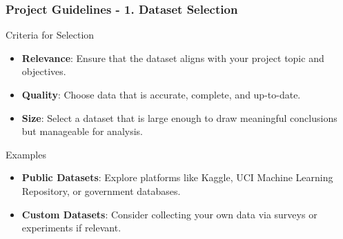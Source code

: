 \documentclass{beamer}
\begin{document}
\begin{frame}[fragile]
    \frametitle{Project Guidelines - 1. Dataset Selection}
    \begin{block}{Criteria for Selection}
        \begin{itemize}
            \item \textbf{Relevance}: Ensure that the dataset aligns with your project topic and objectives.
            \item \textbf{Quality}: Choose data that is accurate, complete, and up-to-date.
            \item \textbf{Size}: Select a dataset that is large enough to draw meaningful conclusions but manageable for analysis.
        \end{itemize}
    \end{block}

    \begin{block}{Examples}
        \begin{itemize}
            \item \textbf{Public Datasets}: Explore platforms like Kaggle, UCI Machine Learning Repository, or government databases.
            \item \textbf{Custom Datasets}: Consider collecting your own data via surveys or experiments if relevant.
        \end{itemize}
    \end{block}
\end{frame}
\end{document}
